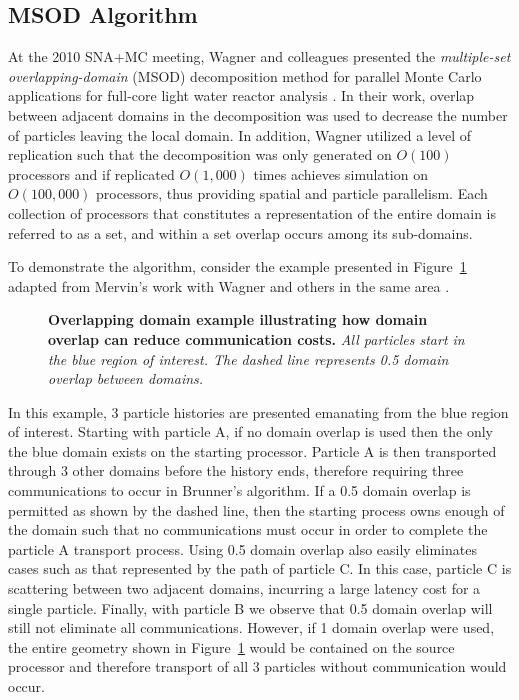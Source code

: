 \documentclass{snamc2013}
\begin{document}
\subsection{MSOD Algorithm}
At the 2010 SNA+MC meeting, Wagner and colleagues presented the
\textit{multiple-set overlapping-domain} (MSOD) decomposition method
for parallel Monte Carlo applications for full-core light water
reactor analysis \cite{wagner_hybrid_2010}. In their work, overlap
between adjacent domains in the decomposition was used to decrease the
number of particles leaving the local domain. In addition, Wagner
utilized a level of replication such that the decomposition was only
generated on $O(100)$ processors and if replicated $O(1,000)$ times
achieves simulation on $O(100,000)$ processors, thus providing spatial
and particle parallelism. Each collection of processors that
constitutes a representation of the entire domain is referred to as a
set, and within a set overlap occurs among its sub-domains.

To demonstrate the algorithm, consider the example presented in
Figure~\ref{fig:msod_example} adapted from Mervin's work with Wagner
and others in the same area \cite{mervin_variance_2012}.
\begin{figure}[h!]
  \begin{center}
    \scalebox{0.8}{  }
  \end{center}
  \caption{\textbf{Overlapping domain example illustrating how domain
      overlap can reduce communication costs.}
    \textit{All particles start in the blue region of interest. The
      dashed line represents 0.5 domain overlap between domains.}}
  \label{fig:msod_example}
\end{figure}
In this example, 3 particle histories are presented emanating from the
blue region of interest. Starting with particle A, if no domain
overlap is used then the only the blue domain exists on the starting
processor. Particle A is then transported through 3 other domains
before the history ends, therefore requiring three communications to
occur in Brunner's algorithm. If a 0.5 domain overlap is permitted as
shown by the dashed line, then the starting process owns enough of the
domain such that no communications must occur in order to complete the
particle A transport process. Using 0.5 domain overlap also easily
eliminates cases such as that represented by the path of particle
C. In this case, particle C is scattering between two adjacent
domains, incurring a large latency cost for a single
particle. Finally, with particle B we observe that 0.5 domain overlap
will still not eliminate all communications. However, if 1 domain
overlap were used, the entire geometry shown in
Figure~\ref{fig:msod_example} would be contained on the source
processor and therefore transport of all 3 particles without
communication would occur.
\end{document}
